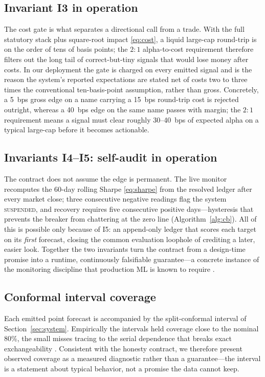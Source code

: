 \documentclass[conference]{IEEEtran}
\begin{document}
\subsection{Invariant I3 in operation}
The cost gate is what separates a directional call from a trade. With the full
statutory stack plus square-root impact \eqref{eq:cost}, a liquid large-cap
round-trip is on the order of tens of basis points; the $2{:}1$ alpha-to-cost
requirement therefore filters out the long tail of correct-but-tiny signals that
would lose money after costs. In our deployment the gate is charged on every
emitted signal and is the reason the system's reported expectations are stated net
of costs two to three times the conventional ten-basis-point assumption, rather
than gross. Concretely, a 5~bps gross edge on a name carrying a 15~bps round-trip
cost is rejected outright, whereas a 40~bps edge on the same name passes with
margin; the $2{:}1$ requirement means a signal must clear roughly 30--40~bps of
expected alpha on a typical large-cap before it becomes actionable.

\subsection{Invariants I4--I5: self-audit in operation}
The contract does not assume the edge is permanent. The live monitor recomputes the
60-day rolling Sharpe \eqref{eq:sharpe} from the resolved ledger after every market
close; three consecutive negative readings flag the system \textsc{suspended}, and
recovery requires five consecutive positive days---hysteresis that prevents the
breaker from chattering at the zero line (Algorithm~\ref{alg:cb}). All of this is
possible only because of I5: an append-only ledger that scores each target on its
\emph{first} forecast, closing the common evaluation loophole of crediting a later,
easier look. Together the two invariants turn the contract from a design-time
promise into a runtime, continuously falsifiable guarantee---a concrete instance of
the monitoring discipline that production ML is known to require
\cite{sculley2015,gama2014}.

\subsection{Conformal interval coverage}
Each emitted point forecast is accompanied by the split-conformal interval of
Section~\ref{sec:system}. Empirically the intervals held coverage close to the
nominal 80\%, the small misses tracing to the serial dependence that breaks exact
exchangeability \cite{angelopoulos2023}. Consistent with the honesty contract, we
therefore present observed coverage as a measured diagnostic rather than a
guarantee---the interval is a statement about typical behavior, not a promise the
data cannot keep.
\end{document}
